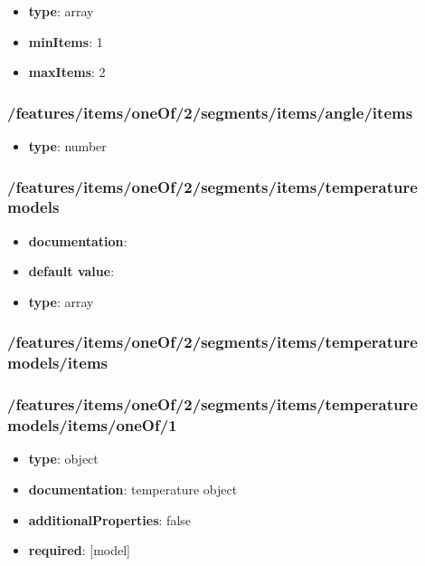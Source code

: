 \begin{itemize}\item {\bf type}: array
\item {\bf minItems}: 1
\item {\bf maxItems}: 2
\end{itemize}\subsubsection{/features/items/oneOf/2/segments/items/angle/items}
\begin{itemize}\item {\bf type}: number
\end{itemize}\subsubsection{/features/items/oneOf/2/segments/items/temperature models}
\begin{itemize}\item {\bf documentation}: 
\item {\bf default value}: 
\item {\bf type}: array
\end{itemize}\subsubsection{/features/items/oneOf/2/segments/items/temperature models/items}

\subsubsection{/features/items/oneOf/2/segments/items/temperature models/items/oneOf/1}
\begin{itemize}\item {\bf type}: object
\item {\bf documentation}: temperature object
\item {\bf additionalProperties}: false
\item {\bf required}: [model]\end{itemize}
